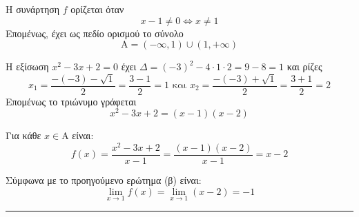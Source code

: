 \begin{alist}
	\item Η συνάρτηση $f$ ορίζεται όταν
	\[
		x-1 \neq 0 \Leftrightarrow x \neq 1
	\]
	Επομένως, έχει ως πεδίο ορισμού το σύνολο
	\[
		\mathrm{A}=(-\infty,1)\cup(1,+\infty)
	\]
	
	\item Η εξίσωση $x^2-3x+2=0$ έχει $\Delta = (-3)^2 - 4 \cdot 1 \cdot 2 = 9-8=1$ και ρίζες
	\[
		x_1 = \frac{-(-3)-\sqrt{1}}{2} = \frac{3-1}{2}=1 \text{ και } x_2 = \frac{-(-3)+\sqrt{1}}{2} = \frac{3+1}{2}=2
	\]
	Επομένως το τριώνυμο γράφεται
	\[
		x^2-3x+2=(x-1)(x-2)
	\]
	
	Για κάθε $x \in \mathrm{A}$ είναι:
	\[
		f(x)=\frac{x^2-3x+2}{x-1}=\frac{(x-1)(x-2)}{x-1}=x-2
	\]
	
	\item Σύμφωνα με το προηγούμενο ερώτημα (β) είναι:
	\[
		\lim\limits_{x\to1}f(x) = \lim\limits_{x\to1}(x-2)=-1
	\]
\end{alist}
\vspace{6mm}
\noindent\rule{\textwidth}{0.4pt}
\vspace{6mm}

